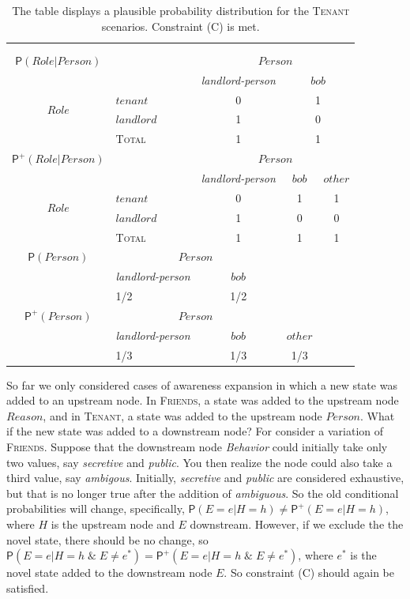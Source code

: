 \documentclass[
  11pt,
  dvipsnames,enabledeprecatedfontcommands]{scrartcl}
\newcommand{\pr}[1]{\ensuremath{\mathsf{P}(#1)}}
\newcommand{\ppr}[2]{\ensuremath{\mathsf{P}^{#1}(#2)}}
\begin{document}
\begin{table}
\begin{tabular}{clccc}
&&&&\\
&&&&\\
$\pr{Role \vert Person}$ & & \multicolumn{3}{c}{$Person$} \\
 &   & \textit{landlord-person}  & \multicolumn{2}{c}{$bob$} \\
\multirow{2}{*}{$Role$} & $tenant$ & 0 & \multicolumn{2}{c}{1}\\
& $landlord$  & 1 & \multicolumn{2}{c}{0} \\
\hline
& \textsc{Total} & 1 & \multicolumn{2}{c}{1}  \\
\hline
\hline
$\ppr{+}{Role \vert Person}$ & & \multicolumn{3}{c}{$Person$} \\
&  & \textit{landlord-person} & $bob$ & $other$ \\
\multirow{2}{*}{$Role$} & $tenant$ & 0 & 1 & 1\\ 
& $landlord$ & 1 & 0 & 0 \\
\hline
& \textsc{Total} & 1 & 1 & 1  \\
\hline
\hline
$\pr{Person}$ & \multicolumn{2}{c}{$Person$} & \\
&  \textit{landlord-person} & $bob$ & \\
& 1/2 & 1/2 & \\
\hline
\hline
$\ppr{+}{Person}$ & \multicolumn{2}{c}{$Person$} & \\
&  \textit{landlord-person} & $bob$ & $other$ \\
& 1/3 & 1/3 & 1/3 \\
\end{tabular}
\caption{The table displays a plausible probability distribution for the \textsc{Tenant} scenarios. Constraint (C) is met.}
\label{table:tenant}
\end{table}

So far we only considered cases of awareness expansion in which a new
state was added to an upstream node. In \textsc{Friends}, a state was
added to the upstream node \(Reason\), and in \textsc{Tenant}, a state
was added to the upstream node \(Person\). What if the new state was
added to a downstream node? For consider a variation of
\textsc{Friends}. Suppose that the downstream node \textit{Behavior}
could initially take only two values, say \textit{secretive} and
\textit{public}. You then realize the node could also take a third
value, say \textit{ambigous}. Initially, \textit{secretive} and
\textit{public} are considered exhaustive, but that is no longer true
after the addition of \textit{ambiguous}. So the old conditional
probabilities will change, specifically,
\(\pr{E=e \vert H=h}\neq \ppr{+}{E=e \vert H=h}\), where \(H\) is the
upstream node and \(E\) downstream. However, if we exclude the the novel
state, there should be no change, so
\(\pr{E=e \vert H=h \; \& \; E\neq e^* } = \ppr{+}{E=e \vert H=h \; \& \; E\neq e^*}\),
where \(e^*\) is the novel state added to the downstream node \(E\). So
constraint (C) should again be satisfied.
\end{document}
